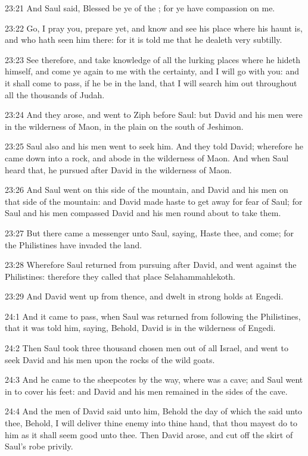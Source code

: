 23:21 And Saul said, Blessed be ye of the \LORD; for ye have compassion
on me.

23:22 Go, I pray you, prepare yet, and know and see his place where
his haunt is, and who hath seen him there: for it is told me that he
dealeth very subtilly.

23:23 See therefore, and take knowledge of all the lurking places
where he hideth himself, and come ye again to me with the certainty,
and I will go with you: and it shall come to pass, if he be in the
land, that I will search him out throughout all the thousands of
Judah.

23:24 And they arose, and went to Ziph before Saul: but David and his
men were in the wilderness of Maon, in the plain on the south of
Jeshimon.

23:25 Saul also and his men went to seek him. And they told David;
wherefore he came down into a rock, and abode in the wilderness of
Maon. And when Saul heard that, he pursued after David in the
wilderness of Maon.

23:26 And Saul went on this side of the mountain, and David and his
men on that side of the mountain: and David made haste to get away for
fear of Saul; for Saul and his men compassed David and his men round
about to take them.

23:27 But there came a messenger unto Saul, saying, Haste thee, and
come; for the Philistines have invaded the land.

23:28 Wherefore Saul returned from pursuing after David, and went
against the Philistines: therefore they called that place
Selahammahlekoth.

23:29 And David went up from thence, and dwelt in strong holds at
Engedi.

24:1 And it came to pass, when Saul was returned from following the
Philistines, that it was told him, saying, Behold, David is in the
wilderness of Engedi.

24:2 Then Saul took three thousand chosen men out of all Israel, and
went to seek David and his men upon the rocks of the wild goats.

24:3 And he came to the sheepcotes by the way, where was a cave; and
Saul went in to cover his feet: and David and his men remained in the
sides of the cave.

24:4 And the men of David said unto him, Behold the day of which the
\LORD said unto thee, Behold, I will deliver thine enemy into thine
hand, that thou mayest do to him as it shall seem good unto thee. Then
David arose, and cut off the skirt of Saul's robe privily.


